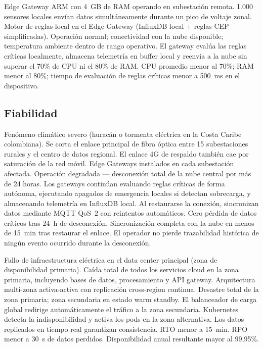 \documentclass[12pt, letterpaper]{article}
\begin{document}
  {Edge Gateway ARM con 4~GB de RAM operando en subestación remota.}
  {1.000 sensores locales envían datos simultáneamente durante un pico de voltaje zonal.}
  {Motor de reglas local en el Edge Gateway (InfluxDB local + reglas CEP simplificadas).}
  {Operación normal; conectividad con la nube disponible; temperatura ambiente dentro
   de rango operativo.}
  {El gateway evalúa las reglas críticas localmente, almacena telemetría en buffer local
   y reenvía a la nube sin superar el 70\% de CPU ni el 80\% de RAM.}
  {CPU promedio menor al 70\%; RAM menor al 80\%; tiempo de evaluación de reglas
   críticas menor a 500~ms en el dispositivo.}

\subsection{Fiabilidad}

  {Fenómeno climático severo (huracán o tormenta eléctrica en la Costa Caribe
   colombiana).}
  {Se corta el enlace principal de fibra óptica entre 15 subestaciones rurales y el
   centro de datos regional. El enlace 4G de respaldo también cae por saturación de la
   red móvil.}
  {Edge Gateways instalados en cada subestación afectada.}
  {Operación degradada --- desconexión total de la nube central por más de 24 horas.}
  {Los gateways continúan evaluando reglas críticas de forma autónoma, ejecutando
   apagados de emergencia locales si detectan sobrecarga, y almacenando telemetría en
   InfluxDB local. Al restaurarse la conexión, sincronizan datos mediante MQTT QoS~2
   con reintentos automáticos.}
  {Cero pérdida de datos críticos tras 24~h de desconexión. Sincronización completa
   con la nube en menos de 15~min tras restaurar el enlace. El operador no pierde
   trazabilidad histórica de ningún evento ocurrido durante la desconexión.}

  {Fallo de infraestructura eléctrica en el data center principal (zona de
   disponibilidad primaria).}
  {Caída total de todos los servicios cloud en la zona primaria, incluyendo bases de
   datos, procesamiento y API gateway.}
  {Arquitectura multi-zona activa-activa con replicación cross-region continua.}
  {Desastre total de la zona primaria; zona secundaria en estado warm standby.}
  {El balanceador de carga global redirige automáticamente el tráfico a la zona
   secundaria. Kubernetes detecta la indisponibilidad y activa los pods en la zona
   alternativa. Los datos replicados en tiempo real garantizan consistencia.}
  {RTO menor a 15~min. RPO menor a 30~s de datos perdidos. Disponibilidad anual
   resultante mayor al 99,95\%.}
\end{document}
